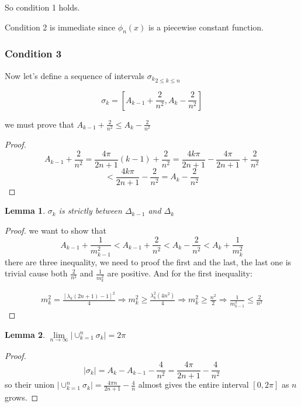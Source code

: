 \documentclass{article}
\newtheorem{lemma}{Lemma}
\begin{document}
So condition 1 holds.\par
Condition 2 is immediate since $ \phi_n(x) $ is a piecewise constant function.\par
\subsubsection*{Condition 3 }



Now let's define a sequence of intervals $ {\sigma_k}_{2 \leqslant k \leqslant n} $

\[ \sigma_k=[A_{k-1}+\frac{2}{n^2},A_k-\frac{2}{n^2}] \]

we must prove that $ A_{k-1}+\frac{2}{n^2}\leqslant  A_k-\frac{2}{n^2} $


\begin{proof}
    \[ A_{k-1}+\frac{2}{n^2}=\frac{4\pi}{2n+1}(k-1)+\frac{2}{n^2}=\frac{4k\pi}{2n+1}-\frac{4\pi}{2n+1}+\frac{2}{n^2} \]
    \[ <\frac{4k\pi}{2n+1}-\frac{2}{n^2}=A_k-\frac{2}{n^2} \]
\end{proof}

\begin{lemma}
    

 $ \sigma_k $ is strictly between $ \Delta_{k-1} $  and $ \Delta_k $
\end{lemma}
\begin{proof}
    we want to show that 
    \[ A_{k-1}+\frac{1}{m^2_{k-1}}<A_{k-1}+\frac{2}{n^2}<A_k-\frac{2}{n^2} <A_k+\frac{1}{m^2_k}\]
    there are three inequality, we need to proof the first and the last, the last one is trivial cause both $ \frac{2}{n^2} $ and $ \frac{1}{m_k^2} $ are positive. And for the first inequality:
   
    \begin{align*}
    m_k^2 = \frac{[\lambda_k(2n+1)-1]^2}{4} \Rightarrow m_k^2 \geqslant \frac{\lambda_k^2(4n^2)}{4}\Rightarrow m_k^2 \geqslant \frac{n^2}{2}\Rightarrow \frac{1}{m_{k-1}^2} \leqslant \frac{2}{n^2} 
    \end{align*}

\end{proof}

\begin{lemma}
    $ \lim\limits_{n\rightarrow \infty} |\cup_{k=1}^n\sigma_k|= 2\pi  $
\end{lemma}

\begin{proof}
 \[ |\sigma_k | = A_k-A_{k-1}-\frac{4}{n^2}= \frac{4\pi}{2n+1}-\frac{4}{n^2}\]
so their union $|\cup_{k=1}^n\sigma_k| = \frac{4\pi n}{2n+1}-\frac{4}{n}$ almost gives the entire interval $ [0,2\pi] $ as $ n $ grows.

\end{proof}
\end{document}
